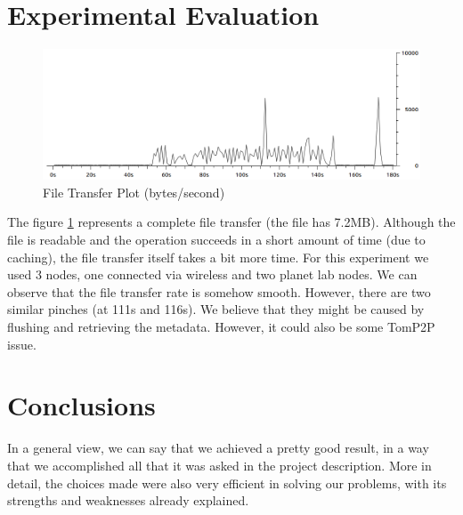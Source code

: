 \documentclass[times,9pt,article]{llncs}
\begin{document}
\section{Experimental Evaluation}

\begin{figure}
\centering
\includegraphics[keepaspectratio,width=1\textwidth]{images/file_transfer.png}
\caption{File Transfer Plot (bytes/second)}
\label{fig:file_transfer}
\end{figure}

The figure \ref{fig:file_transfer} represents a complete file transfer (the file has 7.2MB). Although the file is readable and the operation succeeds in a short amount of time (due to caching), the file transfer itself takes a bit more time. For this experiment we used 3 nodes, one connected via wireless and two planet lab nodes. We can observe that the file transfer rate is somehow smooth. However, there are two similar pinches (at 111s and 116s). We believe that they might be caused by flushing and retrieving the metadata. However, it could also be some TomP2P issue.

\section{Conclusions}
In a general view, we can say that we achieved a pretty good result, in a way that we accomplished all that it was asked in the project description.
More in detail, the choices made were also very efficient in solving our problems, with its strengths and weaknesses already explained.
\end{document}
